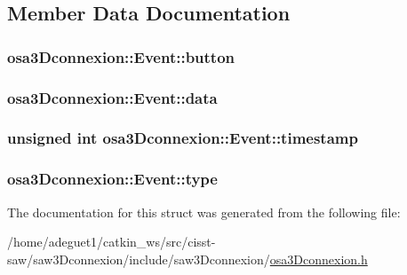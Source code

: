 \subsection{Member Data Documentation}
\hypertarget{structosa3_dconnexion_1_1_event_a7cf9cc55aff27ec81a95735ae1906b0d}{
\subsubsection[{button}]{ osa3\-Dconnexion\-::\-Event\-::button}}\label{structosa3_dconnexion_1_1_event_a7cf9cc55aff27ec81a95735ae1906b0d}
\hypertarget{structosa3_dconnexion_1_1_event_a328ab06ff93f5426fd240fcd5a647449}{
\subsubsection[{data}]{ osa3\-Dconnexion\-::\-Event\-::data}}\label{structosa3_dconnexion_1_1_event_a328ab06ff93f5426fd240fcd5a647449}
\hypertarget{structosa3_dconnexion_1_1_event_a2f0ccc260bb38dfe16957e33e5752a35}{
\subsubsection[{timestamp}]{\setlength{\rightskip}{0pt plus 5cm}unsigned int osa3\-Dconnexion\-::\-Event\-::timestamp}}\label{structosa3_dconnexion_1_1_event_a2f0ccc260bb38dfe16957e33e5752a35}
\hypertarget{structosa3_dconnexion_1_1_event_a5deeb96b286234ec1e97387494676d05}{
\subsubsection[{type}]{ osa3\-Dconnexion\-::\-Event\-::type}}\label{structosa3_dconnexion_1_1_event_a5deeb96b286234ec1e97387494676d05}


The documentation for this struct was generated from the following file\-:\begin{DoxyCompactItemize}
\item 
/home/adeguet1/catkin\-\_\-ws/src/cisst-\/saw/saw3\-Dconnexion/include/saw3\-Dconnexion/\hyperlink{osa3_dconnexion_8h}{osa3\-Dconnexion.\-h}\end{DoxyCompactItemize}
